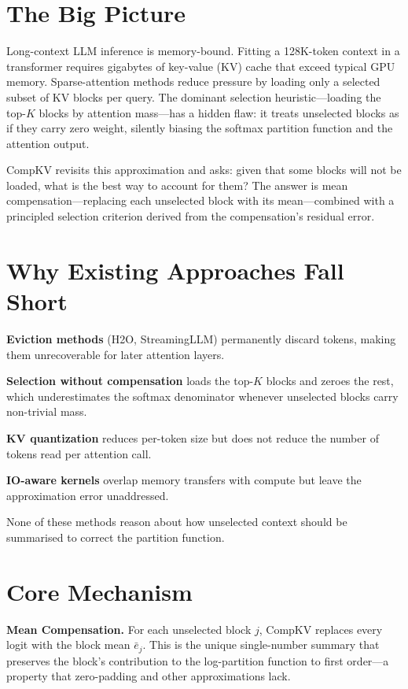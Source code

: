\documentclass[10pt,twocolumn]{article}
\begin{document}
\section{The Big Picture}

Long-context LLM inference is memory-bound. Fitting a 128K-token context in a
transformer requires gigabytes of key-value (KV) cache that exceed typical GPU
memory. Sparse-attention methods reduce pressure by loading only a selected
subset of KV blocks per query. The dominant selection heuristic---loading the
top-$K$ blocks by attention mass---has a hidden flaw: it treats unselected
blocks as if they carry zero weight, silently biasing the softmax partition
function and the attention output.

CompKV revisits this approximation and asks: given that some blocks will not
be loaded, what is the best way to account for them? The answer is mean
compensation---replacing each unselected block with its mean---combined with a
principled selection criterion derived from the compensation's residual error.

\section{Why Existing Approaches Fall Short}

\textbf{Eviction methods} (H2O, StreamingLLM) permanently discard tokens,
making them unrecoverable for later attention layers.

\textbf{Selection without compensation} loads the top-$K$ blocks and zeroes
the rest, which underestimates the softmax denominator whenever unselected
blocks carry non-trivial mass.

\textbf{KV quantization} reduces per-token size but does not reduce the number
of tokens read per attention call.

\textbf{IO-aware kernels} overlap memory transfers with compute but leave the
approximation error unaddressed.

None of these methods reason about how unselected context should be summarised
to correct the partition function.

\section{Core Mechanism}

\textbf{Mean Compensation.} For each unselected block $j$, CompKV replaces
every logit with the block mean $\bar{e}_j$. This is the unique single-number
summary that preserves the block's contribution to the log-partition function
to first order---a property that zero-padding and other approximations lack.
\end{document}

